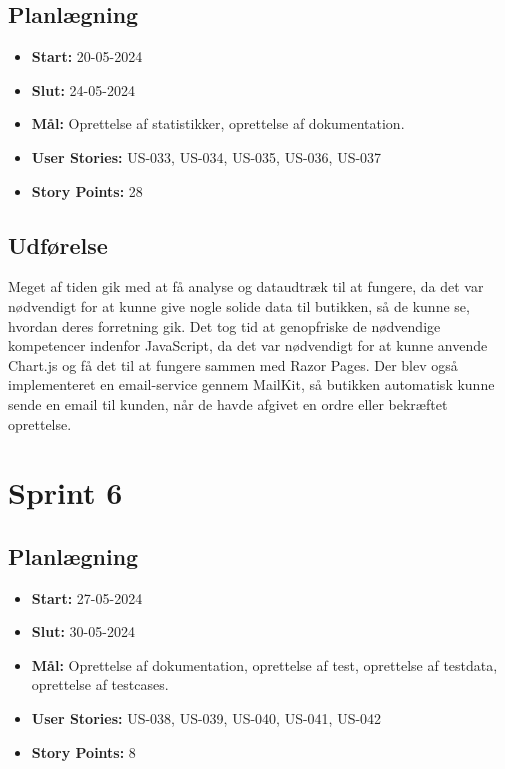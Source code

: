 \subsection{Planlægning}
\label{subsec:sprint-5-plan}
\begin{itemize}
    \item \textbf{Start:} 20-05-2024
    \item \textbf{Slut:} 24-05-2024
    \item \textbf{Mål:} Oprettelse af statistikker, oprettelse af dokumentation.
    \item \textbf{User Stories:} US-033, US-034, US-035, US-036, US-037
    \item \textbf{Story Points:} 28
\end{itemize}

\subsection{Udførelse}
\label{subsec:sprint-5-udforelse}
Meget af tiden gik med at få analyse og dataudtræk til at fungere, da det var nødvendigt for at kunne give nogle solide data til butikken, så de kunne se, hvordan deres forretning gik.
Det tog tid at genopfriske de nødvendige kompetencer indenfor JavaScript, da det var nødvendigt for at kunne anvende Chart.js og få det til at fungere sammen med Razor Pages.
Der blev også implementeret en email-service gennem MailKit, så butikken automatisk kunne sende en email til kunden, når de havde afgivet en ordre eller bekræftet oprettelse.

\section{Sprint 6}
\label{sec:sprint-6}
\subsection{Planlægning}
\label{subsec:sprint-6-plan}
\begin{itemize}
    \item \textbf{Start:} 27-05-2024
    \item \textbf{Slut:} 30-05-2024
    \item \textbf{Mål:} Oprettelse af dokumentation, oprettelse af test, oprettelse af testdata, oprettelse af testcases.
    \item \textbf{User Stories:} US-038, US-039, US-040, US-041, US-042
    \item \textbf{Story Points:} 8
\end{itemize}

